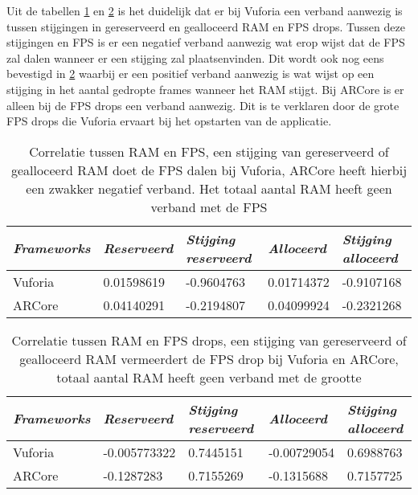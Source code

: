 Uit de tabellen \ref{tbl:ramfps} en \ref{tbl:ramdropfps} is het duidelijk dat er bij Vuforia een verband aanwezig is tussen stijgingen in gereserveerd en gealloceerd RAM en FPS drops. Tussen deze stijgingen en FPS is er een negatief verband aanwezig wat erop wijst dat de FPS zal dalen wanneer er een stijging zal plaatsenvinden. Dit wordt ook nog eens bevestigd in \ref{tbl:ramdropfps} waarbij er een positief verband aanwezig is wat wijst op een stijging in het aantal gedropte frames wanneer het RAM stijgt. Bij ARCore is er alleen bij de FPS drops een verband aanwezig. Dit is te verklaren door de grote FPS drops die Vuforia ervaart bij het opstarten van de applicatie.
\begin{table}
    \centering
    \begin{tabular}{lllll}\toprule
       \textit{Frameworks} & \textit{Reserveerd} & \textit{Stijging reserveerd} & \textit{Alloceerd}  & \textit{Stijging alloceerd} \\ \midrule
        Vuforia & 0.01598619 & -0.9604763          & 0.01714372 & -0.9107168         \\ 
        ARCore  & 0.04140291 & -0.2194807          & 0.04099924 & -0.2321268        \\ \bottomrule
    \end{tabular}
\caption{Correlatie tussen RAM en FPS, een stijging van gereserveerd of gealloceerd RAM doet de FPS dalen bij Vuforia, ARCore heeft hierbij een zwakker negatief verband. Het totaal aantal RAM heeft geen verband met de FPS}\label{tbl:ramfps}
\end{table}

\begin{table}
    \centering
    \begin{tabular}{lllll}\toprule
        \textit{Frameworks} & \textit{Reserveerd}   & \textit{Stijging reserveerd} & \textit{Alloceerd}   & \textit{Stijging alloceerd} \\ \midrule
        Vuforia & -0.005773322 & 0.7445151           & -0.00729054 & 0.6988763          \\
        ARCore  & -0.1287283   & 0.7155269           & -0.1315688  & 0.7157725   \\    \bottomrule 
    \end{tabular}
\caption{Correlatie tussen RAM en FPS drops, een stijging van gereserveerd of gealloceerd RAM vermeerdert de FPS drop bij Vuforia en ARCore, totaal aantal RAM heeft geen verband met de grootte}\label{tbl:ramdropfps}
\end{table}

